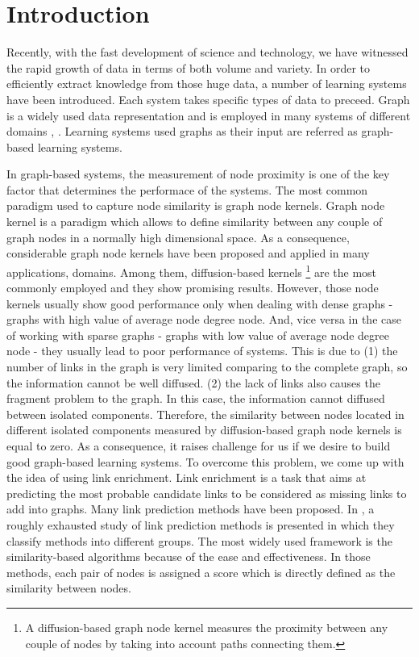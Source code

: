 \documentclass[runningheads,a4paper]{llncs}
\begin{document}
\section{Introduction}

Recently, with the fast development of science and technology, we have witnessed the rapid growth of data in terms of both volume and variety. In order to efficiently extract knowledge from those huge data, a number of learning systems have been introduced. Each system takes specific types of data to preceed. Graph is a widely used data representation and is employed in many systems of different domains \cite{proceeding1}, \cite{jour1}. Learning systems used graphs as their input are referred as graph-based learning systems.

In graph-based systems, the measurement of node proximity is one of the key factor that determines the performace of the systems. The most common paradigm used to capture node similarity is graph node kernels. Graph node kernel is a paradigm which allows to define similarity between any couple of graph nodes in a normally high dimensional space. As a consequence, considerable graph node kernels have been proposed and applied in many applications, domains. Among them, diffusion-based kernels \footnote{A diffusion-based graph node kernel measures the proximity between any couple of nodes by taking into account paths connecting them.} are the most commonly employed and they show promising results. However, those node kernels usually show good performance only when dealing with dense graphs - graphs with high value of average node degree node. And, vice versa in the case of working with sparse graphs - graphs with low value of average node degree node - they usually lead to poor performance of systems. This is due to (1) the number of links in the graph is very limited comparing to the complete graph, so the information cannot be well diffused. (2) the lack of links also causes the fragment problem to the graph. In this case, the information cannot diffused between isolated components. Therefore, the similarity between nodes located in different isolated components measured by diffusion-based graph node kernels is equal to zero. As a consequence, it raises challenge for us if we desire to build good graph-based learning systems. To overcome this problem, we come up with the idea of using link enrichment. Link enrichment is a task that aims at predicting the most probable candidate links to be considered as missing links to add into graphs. Many link prediction methods have been proposed. In \cite{jour2}, a roughly exhausted study of link prediction methods is presented in which they classify methods into different groups. The most widely used framework is the similarity-based algorithms because of the ease and effectiveness. In those methods, each pair of nodes is assigned a score which is directly defined as the similarity between nodes.
\end{document}
